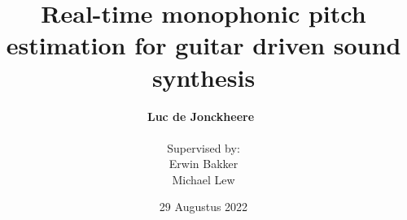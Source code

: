 \documentclass[table]{beamer}
\begin{document}
\title[Real-time monophonic pitch estimation]{{\LARGE Real-time monophonic pitch estimation for guitar driven sound synthesis}}
\author[Luc de Jonckheere]{\textbf{{\large Luc de Jonckheere}}~\\~\\{\small Supervised by:\\Erwin Bakker\\Michael Lew}}
\date[29 Augustus 2022]{29 Augustus 2022}

\frame{\titlepage}


\end{document}
